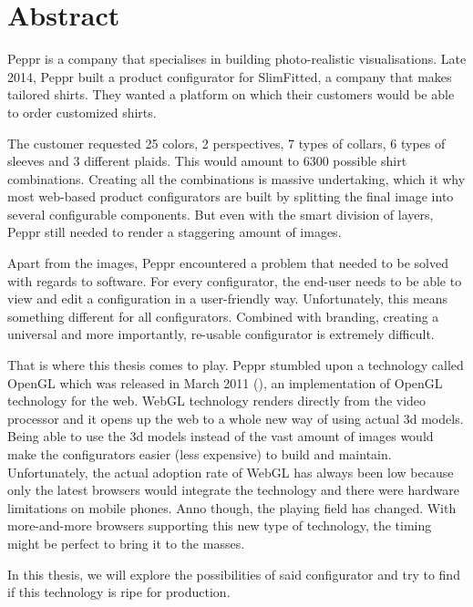 \chapter*{Abstract}%

Peppr is a company that specialises in building photo-realistic visualisations. Late 2014, Peppr built a product configurator for SlimFitted, a company that makes tailored shirts. They wanted a platform on which their customers would be able to order customized shirts.

The customer requested 25 colors, 2 perspectives, 7 types of collars, 6 types of sleeves and 3 different plaids. This would amount to 6300 possible shirt combinations. Creating all the combinations is massive undertaking, which it why most web-based product configurators are built by splitting the final image into several configurable components. But even with the smart division of layers, Peppr still needed to render a staggering amount of images.

Apart from the images, Peppr encountered a problem that needed to be solved with regards to software. For every configurator, the end-user needs to be able to view and edit a configuration in a user-friendly way. Unfortunately, this means something different for all configurators. Combined with branding, creating a universal and more importantly, re-usable configurator is extremely difficult.

That is where this thesis comes to play. Peppr stumbled upon a technology called OpenGL which was released in March 2011 (\cite{OpenGL Website}), an implementation of OpenGL technology for the web. WebGL technology renders directly from the video processor and it opens up the web to a whole new way of using actual 3d models. Being able to use the 3d models instead of the vast amount of images would make the configurators easier (less expensive) to build and maintain. Unfortunately, the actual adoption rate of WebGL has always been low because only the latest browsers would integrate the technology and there were hardware limitations on mobile phones. Anno though, the playing field has changed. With more-and-more browsers supporting this new type of technology, the timing might be perfect to bring it to the masses.

In this thesis, we will explore the possibilities of said configurator and try to find if this technology is ripe for production.